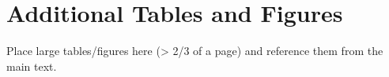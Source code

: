 \chapter{Additional Tables and Figures}

Place large tables/figures here (> 2/3 of a page) and reference them from the main text.
